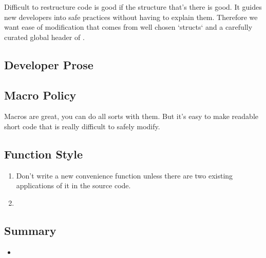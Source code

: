 Difficult to restructure code is good if the structure that's there is good.
It guides new developers into safe practices without having to explain them.
Therefore we want ease of modification that comes from well chosen `structs`
and a carefully curated global header of .

\subsection{Developer Prose}


\subsection{Macro Policy}

Macros are great, you can do all sorts with them. But it's easy to make readable
short code that is really difficult to safely modify.

\subsection{Function Style}

\begin{enumerate}
\item Don't write a new convenience function unless there are two
existing applications of it in the source code.
\item 
\end{enumerate}

\subsection{Summary}

\begin{itemize}
\item 
\end{itemize}

